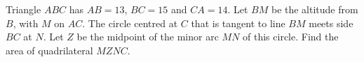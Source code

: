Triangle $ABC$ has $AB=13$, $BC=15$ and $CA=14$. Let $BM$ be the altitude from $B$, with $M$ on $AC$. The circle centred at $C$ that is tangent to line $BM$ meets side $BC$ at $N$. Let $Z$ be the midpoint of the minor arc $MN$ of this circle. Find the area of quadrilateral $MZNC$.
